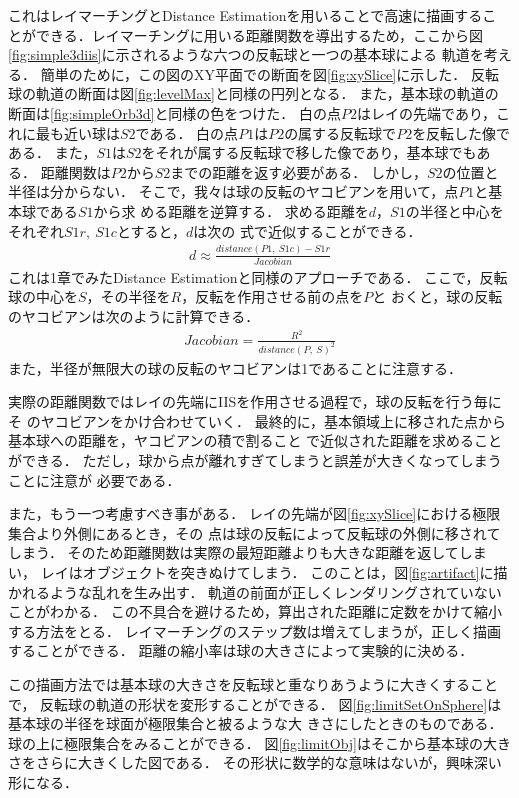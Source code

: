 これはレイマーチングとDistance Estimationを用いることで高速に描画するこ
とができる．レイマーチングに用いる距離関数を導出するため，ここから図
\ref{fig:simple3diis}に示されるような六つの反転球と一つの基本球による
軌道を考える．
簡単のために，この図のXY平面での断面を図\ref{fig:xySlice}に示した．
反転球の軌道の断面は図\ref{fig:levelMax}と同様の円列となる．
また，基本球の軌道の断面は\ref{fig:simpleOrb3d}と同様の色をつけた．
白の点$P2$はレイの先端であり，これに最も近い球は$S2$である．
白の点$P1$は$P2$の属する反転球で$P2$を反転した像である．
また，$S1$は$S2$をそれが属する反転球で移した像であり，基本球でもある．
距離関数は$P2$から$S2$までの距離を返す必要がある．
しかし，$S2$の位置と半径は分からない．
そこで，我々は球の反転のヤコビアンを用いて，点$P1$と基本球である$S1$から求
める距離を逆算する．
求める距離を$d$，$S1$の半径と中心をそれぞれ$S1r,~S1c$とすると，$d$は次の
式で近似することができる．
\begin{align*}
 d \approx \frac{distance(P1,~S1c) - S1r}{Jacobian}
\end{align*}
これは1章でみたDistance Estimationと同様のアプローチである．
ここで，反転球の中心を$S$，その半径を$R$，反転を作用させる前の点を$P$と
おくと，球の反転のヤコビアンは次のように計算できる．
\begin{align*}
 Jacobian = \frac{R^2}{distance(P,~S)^2}
\end{align*}
また，半径が無限大の球の反転のヤコビアンは1であることに注意する．

実際の距離関数ではレイの先端にIISを作用させる過程で，球の反転を行う毎にそ
のヤコビアンをかけ合わせていく．
最終的に，基本領域上に移された点から基本球への距離を，ヤコビアンの積で割ること
で近似された距離を求めることができる．
ただし，球から点が離れすぎてしまうと誤差が大きくなってしまうことに注意が
必要である．

また，もう一つ考慮すべき事がある．
レイの先端が図\ref{fig:xySlice}における極限集合より外側にあるとき，その
点は球の反転によって反転球の外側に移されてしまう．
そのため距離関数は実際の最短距離よりも大きな距離を返してしまい，
レイはオブジェクトを突きぬけてしまう．
このことは，図\ref{fig:artifact}に描かれるような乱れを生み出す．
軌道の前面が正しくレンダリングされていないことがわかる．
この不具合を避けるため，算出された距離に定数をかけて縮小する方法をとる．
レイマーチングのステップ数は増えてしまうが，正しく描画することができる．
距離の縮小率は球の大きさによって実験的に決める．

この描画方法では基本球の大きさを反転球と重なりあうように大きくすることで，
反転球の軌道の形状を変形することができる．
図\ref{fig:limitSetOnSphere}は基本球の半径を球面が極限集合と被るような大
きさにしたときのものである．
球の上に極限集合をみることができる．
図\ref{fig:limitObj}はそこから基本球の大きさをさらに大きくした図である．
その形状に数学的な意味はないが，興味深い形になる．

